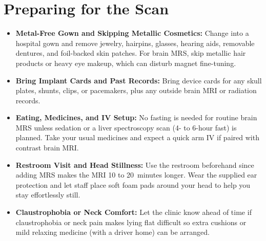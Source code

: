 \section{Preparing for the Scan}
\begin{itemize}
\item \textbf{Metal-Free Gown and Skipping Metallic Cosmetics:} Change into a hospital gown and remove jewelry, hairpins, glasses, hearing aids, removable dentures, and foil-backed skin patches. For brain MRS, skip metallic hair products or heavy eye makeup, which can disturb magnet fine-tuning.
\item \textbf{Bring Implant Cards and Past Records:} Bring device cards for any skull plates, shunts, clips, or pacemakers, plus any outside brain MRI or radiation records.
\item \textbf{Eating, Medicines, and IV Setup:} No fasting is needed for routine brain MRS unless sedation or a liver spectroscopy scan (4- to 6-hour fast) is planned. Take your usual medicines and expect a quick arm IV if paired with contrast brain MRI.
\item \textbf{Restroom Visit and Head Stillness:} Use the restroom beforehand since adding MRS makes the MRI 10 to 20~minutes longer. Wear the supplied ear protection and let staff place soft foam pads around your head to help you stay effortlessly still.
\item \textbf{Claustrophobia or Neck Comfort:} Let the clinic know ahead of time if claustrophobia or neck pain makes lying flat difficult so extra cushions or mild relaxing medicine (with a driver home) can be arranged.
\end{itemize}

